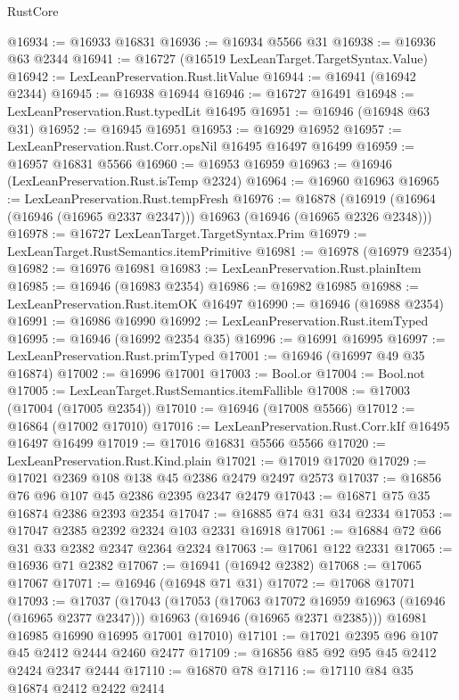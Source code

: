 \begin{lexlean}{RustCore}
\begin{coremodule}
@16934 := @16933 @16831
@16936 := @16934 @5566 @31
@16938 := @16936 @63 @2344
@16941 := @16727 (@16519 LexLeanTarget.TargetSyntax.Value)
@16942 := LexLeanPreservation.Rust.litValue
@16944 := @16941 (@16942 @2344)
@16945 := @16938 @16944
@16946 := @16727 @16491
@16948 := LexLeanPreservation.Rust.typedLit @16495
@16951 := @16946 (@16948 @63 @31)
@16952 := @16945 @16951
@16953 := @16929 @16952
@16957 := LexLeanPreservation.Rust.Corr.opsNil @16495 @16497 @16499
@16959 := @16957 @16831 @5566
@16960 := @16953 @16959
@16963 := @16946 (LexLeanPreservation.Rust.isTemp @2324)
@16964 := @16960 @16963
@16965 := LexLeanPreservation.Rust.tempFresh
@16976 := @16878
    (@16919 (@16964 (@16946 (@16965 @2337 @2347))) @16963 (@16946 (@16965 @2326 @2348)))
@16978 := @16727 LexLeanTarget.TargetSyntax.Prim
@16979 := LexLeanTarget.RustSemantics.itemPrimitive
@16981 := @16978 (@16979 @2354)
@16982 := @16976 @16981
@16983 := LexLeanPreservation.Rust.plainItem
@16985 := @16946 (@16983 @2354)
@16986 := @16982 @16985
@16988 := LexLeanPreservation.Rust.itemOK @16497
@16990 := @16946 (@16988 @2354)
@16991 := @16986 @16990
@16992 := LexLeanPreservation.Rust.itemTyped
@16995 := @16946 (@16992 @2354 @35)
@16996 := @16991 @16995
@16997 := LexLeanPreservation.Rust.primTyped
@17001 := @16946 (@16997 @49 @35 @16874)
@17002 := @16996 @17001
@17003 := Bool.or
@17004 := Bool.not
@17005 := LexLeanTarget.RustSemantics.itemFallible
@17008 := @17003 (@17004 (@17005 @2354))
@17010 := @16946 (@17008 @5566)
@17012 := @16864 (@17002 @17010)
@17016 := LexLeanPreservation.Rust.Corr.kIf @16495 @16497 @16499
@17019 := @17016 @16831 @5566 @5566
@17020 := LexLeanPreservation.Rust.Kind.plain
@17021 := @17019 @17020
@17029 := @17021 @2369 @108 @138 @45 @2386 @2479 @2497 @2573
@17037 := @16856 @76 @96 @107 @45 @2386 @2395 @2347 @2479
@17043 := @16871 @75 @35 @16874 @2386 @2393 @2354
@17047 := @16885 @74 @31 @34 @2334
@17053 := @17047 @2385 @2392 @2324 @103 @2331 @16918
@17061 := @16884 @72 @66 @31 @33 @2382 @2347 @2364 @2324
@17063 := @17061 @122 @2331
@17065 := @16936 @71 @2382
@17067 := @16941 (@16942 @2382)
@17068 := @17065 @17067
@17071 := @16946 (@16948 @71 @31)
@17072 := @17068 @17071
@17093 := @17037
    (@17043
      (@17053
        (@17063 @17072 @16959 @16963 (@16946 (@16965 @2377 @2347)))
        @16963
        (@16946 (@16965 @2371 @2385)))
      @16981
      @16985
      @16990
      @16995
      @17001
      @17010)
@17101 := @17021 @2395 @96 @107 @45 @2412 @2444 @2460 @2477
@17109 := @16856 @85 @92 @95 @45 @2412 @2424 @2347 @2444
@17110 := @16870 @78
@17116 := @17110 @84 @35 @16874 @2412 @2422 @2414

\end{coremodule}
\end{lexlean}
